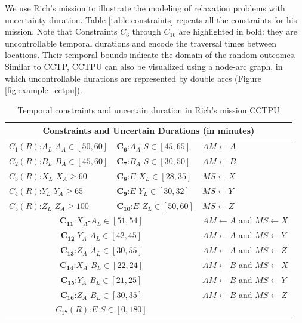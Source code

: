 \documentclass[jair,twoside,11pt,theapa]{article}
\begin{document}
We use Rich's mission to illustrate the modeling of relaxation problems
with uncertainty duration. Table \ref{table:constraints} repeats all the
constraints for his mission. Note that Constraints $C_6$ through $C_{16}$ are
highlighted in bold: they are uncontrollable temporal durations and encode the
traversal times between locations. Their temporal bounds indicate the domain of
the random outcomes. Similar to CCTP, CCTPU can also be visualized using a
node-arc graph, in which uncontrollable durations are represented by double arcs
(Figure \ref{fig:example_cctpu}).

\begin{table}[ht!]	
	\centering
	\begin{tabular}{| m{4.2cm} m{4.2cm} m{4.5cm}|}
		\hline
		\multicolumn{3}{|c|}{\textbf{Constraints and Uncertain Durations (in minutes)}} \\		
		\hline		
		$C_1(R)$:$A_L$-$A_A\in [50,60]$ & $\mathbf{C_6}$:$A_A$-$S\in[45,65]$ & $AM \leftarrow A$ \\ 
		$C_2(R)$:$B_L$-$B_A\in [45,60]$ & $\mathbf{C_7}$:$B_A$-$S\in[30,50]$ & $AM \leftarrow B$ \\ 
		$C_3(R)$:$X_L$-$X_A\geq60$ & $\mathbf{C_8}$:$E$-$X_L\in[28,35]$ & $MS \leftarrow X$ \\ 
		$C_4(R)$:$Y_L$-$Y_A\geq65$ & $\mathbf{C_9}$:$E$-$Y_L\in[30,32]$ & $MS \leftarrow Y$ \\ 
		$C_5(R)$:$Z_L$-$Z_A\geq100$ & $\mathbf{C_{10}}$:$E$-$Z_L\in[50,60]$ & $MS \leftarrow Z$ \\ 
		\hline
		\multicolumn{2}{|c}{$\mathbf{C_{11}}$:$X_A$-$A_L\in[51,54]$} & $AM \leftarrow A$ and $MS \leftarrow X$ \\ 
		\multicolumn{2}{|c}{$\mathbf{C_{12}}$:$Y_A$-$A_L\in[42,45]$} & $AM \leftarrow A$ and $MS \leftarrow Y$ \\ 
		\multicolumn{2}{|c}{$\mathbf{C_{13}}$:$Z_A$-$A_L\in[30,55]$} & $AM \leftarrow A$ and $MS \leftarrow Z$ \\ 
		\multicolumn{2}{|c}{$\mathbf{C_{14}}$:$X_A$-$B_L\in[22,24]$} & $AM \leftarrow B$ and $MS \leftarrow X$ \\ 
		\multicolumn{2}{|c}{$\mathbf{C_{15}}$:$Y_A$-$B_L\in[21,25]$} & $AM \leftarrow B$ and $MS \leftarrow Y$ \\ 
		\multicolumn{2}{|c}{$\mathbf{C_{16}}$:$Z_A$-$B_L\in[30,35]$} & $AM \leftarrow B$ and $MS \leftarrow Z$ \\ \hline
		\multicolumn{2}{|c}{$C_{17}(R)$:$E$-$S\in[0,180]$} & \\
		\hline
	\end{tabular}
	\caption{Temporal constraints and uncertain duration in Rich's mission CCTPU}
	\label{table:stnu_constraints}
\end{table}
\end{document}
